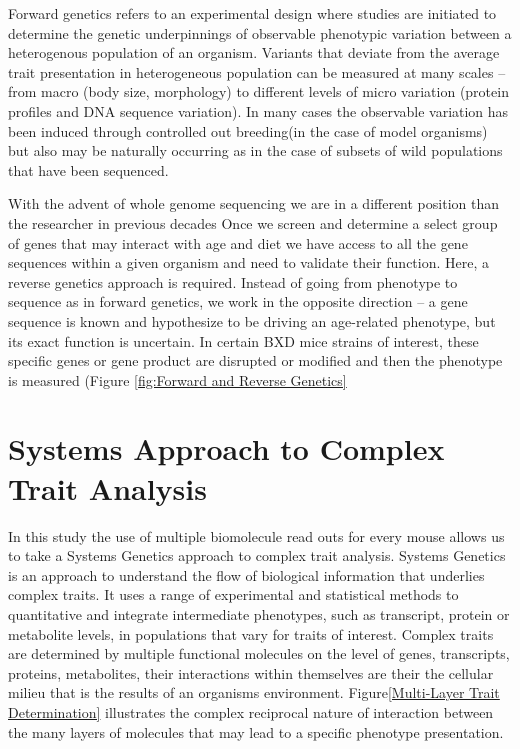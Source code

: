 \documentclass[a4paper]{book}
\begin{document}
Forward genetics refers to an experimental design where studies are initiated to determine the genetic underpinnings of observable phenotypic variation between a heterogenous population of an organism. Variants that deviate from the average trait presentation in heterogeneous population can be measured at many scales – from macro (body size, morphology) to different levels of micro variation (protein profiles and DNA sequence variation). In many cases the observable variation has been induced through controlled out breeding(in the case of model organisms) but also may be naturally occurring as in the case of subsets of wild populations that have been sequenced. 

With the advent of whole genome sequencing we are in a different position than the researcher in previous decades Once we screen and determine a select group of genes that may interact with age and diet we have access to all the gene sequences within a given organism and need to validate their function. Here, a reverse genetics approach is required. Instead of going from phenotype to sequence as in forward genetics, we work  in the opposite direction – a gene sequence is known and hypothesize to be driving an age-related phenotype, but its exact function is uncertain. In certain BXD mice strains of interest, these specific genes or gene product are disrupted or modified and then the phenotype is measured (Figure \ref{fig:Forward and Reverse Genetics} 
	
	\section{Systems Approach to Complex Trait Analysis}
	
	In this study the use of multiple biomolecule read outs for every mouse allows us to take a Systems Genetics approach to complex trait analysis. Systems Genetics is an approach to understand the flow of biological information that underlies complex traits. It uses a range of experimental and statistical methods to quantitative and integrate intermediate phenotypes, such as transcript, protein or metabolite levels, in populations that vary for traits of interest. Complex traits are determined by multiple functional molecules on the level of genes, transcripts, proteins, metabolites, their interactions within themselves are their the cellular milieu that is the results of an organisms environment\citep{Civelek2014SystemsTraits}. Figure\ref{Multi-Layer Trait Determination} illustrates the complex reciprocal nature of interaction between the many layers of molecules that may lead to a specific phenotype presentation. 
	
\end{document}
